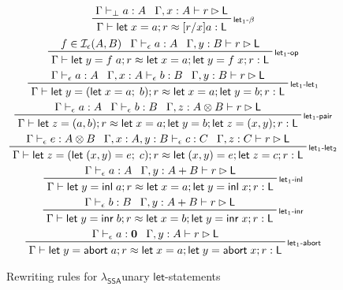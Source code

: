 \documentclass[acmsmall,screen,review]{acmart}
\newcommand{\mc}[1]{\ensuremath{\mathcal{#1}}}
\newcommand{\mb}[1]{\ensuremath{\mathbf{#1}}}
\newcommand{\ms}[1]{\ensuremath{\mathsf{#1}}}
\newcommand{\linl}[1]{\ms{inl}\;{#1}}
\newcommand{\linr}[1]{\ms{inr}\;{#1}}
\newcommand{\labort}[1]{\ms{abort}\;{#1}}
\newcommand{\letexpr}[3]{\ensuremath{\ms{let}\;#1 = #2;\;#3}}
\newcommand{\letstmt}[3]{\ensuremath{\ms{let}\;#1 = #2; #3}}
\newcommand{\bhyp}[2]{#1 : #2}
\newcommand{\rle}[1]{{\scriptsize\textsf{#1}}}
\newcommand{\hasty}[4]{#1 \vdash_{#2} #3: {#4}}
\newcommand{\haslb}[3]{#1 \vdash #2 \rhd #3}
\newcommand{\isop}[4]{#1 \in \mc{I}_{#4}(#2, #3)}
\newcommand{\teqv}{\approx}
\newcommand{\lbeq}[4]{#1 \vdash #2 \teqv #3 : {#4}}
\newcommand{\isotopessa}{\(\lambda_{\ms{SSA}}\)}
\begin{document}
\begin{figure}
  \begin{gather*}
    \prftree[r]{\rle{let$_1$-$\beta$}}
      {\hasty{\Gamma}{\bot}{a}{A}}
      {\haslb{\Gamma, \bhyp{x}{A}}{r}{\ms{L}}}
      {\lbeq{\Gamma}{\letstmt{x}{a}{r}}{[r/x]a}{\ms{L}}}
    \\
      \prftree[r]{\rle{let$_1$-op}}
      {\isop{f}{A}{B}{\epsilon}}
      {\hasty{\Gamma}{\epsilon}{a}{A}}
      {\haslb{\Gamma, \bhyp{y}{B}}{r}{\ms{L}}}
      {\lbeq{\Gamma}{\letstmt{y}{f\;a}{r}}{\letstmt{x}{a}{\letstmt{y}{f\;x}{r}}}{\ms{L}}}
    \\
    \prftree[r]{\rle{let$_{1}$-let$_1$}}
      {\hasty{\Gamma}{\epsilon}{a}{A}}
      {\hasty{\Gamma, \bhyp{x}{A}}{\epsilon}{b}{B}}
      {\haslb{\Gamma, \bhyp{y}{B}}{r}{\ms{L}}}
      {\lbeq{\Gamma}{\letstmt{y}{(\letexpr{x}{a}{b})}{r}}{\letstmt{x}{a}{\letstmt{y}{b}{r}}}{\ms{L}}}
    \\
    \prftree[r]{\rle{let$_1$-pair}}
      {\hasty{\Gamma}{\epsilon}{a}{A}}
      {\hasty{\Gamma}{\epsilon}{b}{B}}
      {\haslb{\Gamma, \bhyp{z}{A \otimes B}}{r}{\ms{L}}}
      {\lbeq{\Gamma}
        {\letstmt{z}{(a, b)}{r}}
        {\letstmt{x}{a}{\letstmt{y}{b}{\letstmt{z}{(x, y)}{r}}}}
        {\ms{L}}}
    \\
    \prftree[r]{\rle{let$_{1}$-let$_2$}}
      {\hasty{\Gamma}{\epsilon}{e}{A \otimes B}}
      {\hasty{\Gamma, \bhyp{x}{A}, \bhyp{y}{B}}{\epsilon}{c}{C}}
      {\haslb{\Gamma, \bhyp{z}{C}}{r}{\ms{L}}}
      {\lbeq{\Gamma}
        {\letstmt{z}{(\letexpr{(x, y)}{e}{c})}{r}}
        {\letstmt{(x, y)}{e}{\letstmt{z}{c}{r}}}
        {\ms{L}}}
    \\
    \prftree[r]{\rle{let$_1$-inl}}
      {\hasty{\Gamma}{\epsilon}{a}{A}}
      {\haslb{\Gamma, \bhyp{y}{A + B}}{r}{\ms{L}}}
      {\lbeq{\Gamma}{\letstmt{y}{\linl{a}}{r}}{\letstmt{x}{a}{\letstmt{y}{\linl{x}}{r}}}{\ms{L}}}
    \\
    \prftree[r]{\rle{let$_1$-inr}}
      {\hasty{\Gamma}{\epsilon}{b}{B}}
      {\haslb{\Gamma, \bhyp{y}{A + B}}{r}{\ms{L}}}
      {\lbeq{\Gamma}{\letstmt{y}{\linr{b}}{r}}{\letstmt{x}{b}{\letstmt{y}{\linr{x}}{r}}}{\ms{L}}}
    \\
    \prftree[r]{\rle{let$_1$-abort}}
      {\hasty{\Gamma}{\epsilon}{a}{\mb{0}}}
      {\haslb{\Gamma, \bhyp{y}{A}}{r}{\ms{L}}}
      {\lbeq{\Gamma}{\letstmt{y}{\labort{a}}{r}}
        {\letstmt{x}{a}{\letstmt{y}{\labort{x}}{r}}}{\ms{L}}}
  \end{gather*}
  \Description{}
  \caption{Rewriting rules for \isotopessa unary \ms{let}-statements}
  \label{fig:ssa-reg-unary-let}
\end{figure}
\end{document}
